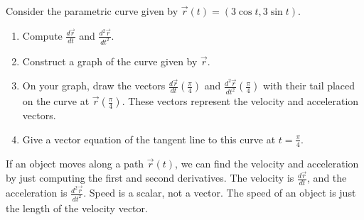 \begin{problem}  
Consider the parametric curve given by $\vec r(t)=( 3\cos t, 3\sin t )$. 
\begin{enumerate}
\item Compute $\frac{d\vec r}{dt}$ and $\frac{d^2\vec r}{dt^2}$. 
\item Construct a graph of the curve given by $\vec r$.  
\item On your graph, draw the vectors $\frac{d\vec r}{dt}\left(\frac{\pi}{4}\right)$ and $\frac{d^2\vec r}{dt^2}\left(\frac{\pi}{4}\right)$ with their tail placed on the curve at $\vec r\left(\frac{\pi}{4}\right)$. These vectors represent the velocity and acceleration vectors.
\item Give a vector equation of the tangent line to this curve at $t=\frac{\pi}{4}$. 
\end{enumerate}
\end{problem}

\begin{definition}\label{definition velocity acceleration}
If an object moves along a path $\vec r(t)$, we can find the velocity and acceleration by just computing the first and second derivatives. The velocity is $\frac{d\vec r}{dt}$, and the acceleration is $\frac{d^2\vec r}{dt^2}$. Speed is a scalar, not a vector. The speed of an object is just the length of the velocity vector.
\end{definition}

